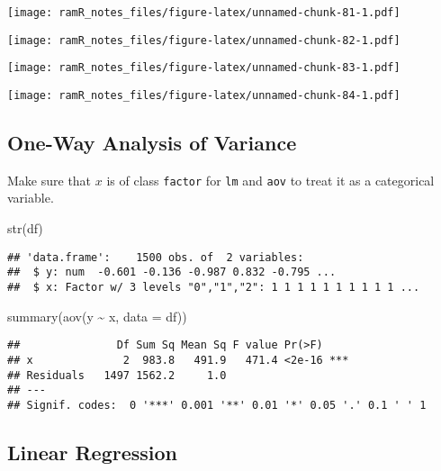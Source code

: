 \documentclass[
]{book}
\newenvironment{Shaded}{\begin{snugshade}}{\end{snugshade}}
\newcommand{\AttributeTok}[1]{\textcolor[rgb]{0.77,0.63,0.00}{#1}}
\newcommand{\FunctionTok}[1]{\textcolor[rgb]{0.00,0.00,0.00}{#1}}
\newcommand{\NormalTok}[1]{#1}
\newcommand{\SpecialCharTok}[1]{\textcolor[rgb]{0.00,0.00,0.00}{#1}}
\theoremstyle{definition}
\theoremstyle{definition}
\theoremstyle{definition}
\theoremstyle{remark}
\begin{document}
\texttt{[image: ramR\_notes\_files/figure-latex/unnamed-chunk-81-1.pdf]}

\texttt{[image: ramR\_notes\_files/figure-latex/unnamed-chunk-82-1.pdf]}

\texttt{[image: ramR\_notes\_files/figure-latex/unnamed-chunk-83-1.pdf]}

\texttt{[image: ramR\_notes\_files/figure-latex/unnamed-chunk-84-1.pdf]}

\hypertarget{one-way-analysis-of-variance}{%
\subsection{One-Way Analysis of Variance}\label{one-way-analysis-of-variance}}

Make sure that \(x\) is of class \texttt{factor} for \texttt{lm} and \texttt{aov}
to treat it as a categorical variable.

\begin{Shaded}
\begin{Highlighting}[]
\FunctionTok{str}\NormalTok{(df)}
\end{Highlighting}
\end{Shaded}

\begin{verbatim}
## 'data.frame':    1500 obs. of  2 variables:
##  $ y: num  -0.601 -0.136 -0.987 0.832 -0.795 ...
##  $ x: Factor w/ 3 levels "0","1","2": 1 1 1 1 1 1 1 1 1 1 ...
\end{verbatim}

\begin{Shaded}
\begin{Highlighting}[]
\FunctionTok{summary}\NormalTok{(}\FunctionTok{aov}\NormalTok{(y }\SpecialCharTok{\textasciitilde{}}\NormalTok{ x, }\AttributeTok{data =}\NormalTok{ df))}
\end{Highlighting}
\end{Shaded}

\begin{verbatim}
##               Df Sum Sq Mean Sq F value Pr(>F)    
## x              2  983.8   491.9   471.4 <2e-16 ***
## Residuals   1497 1562.2     1.0                   
## ---
## Signif. codes:  0 '***' 0.001 '**' 0.01 '*' 0.05 '.' 0.1 ' ' 1
\end{verbatim}

\hypertarget{linear-regression-1}{%
\subsection{Linear Regression}\label{linear-regression-1}}
\end{document}
